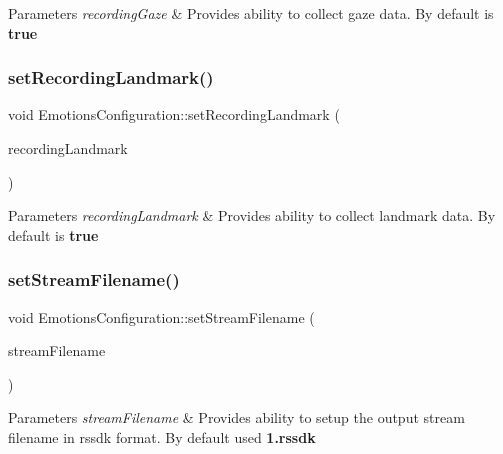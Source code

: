 \begin{DoxyParams}{Parameters}
{\em recording\+Gaze} & Provides ability to collect gaze data. By default is {\bfseries true}\\
\hline
\end{DoxyParams}
\mbox{\label{class_emotions_configuration_a6d50830265d85761f5dd0abfa12d5fcb}} 
\subsubsection{\texorpdfstring{set\+Recording\+Landmark()}{setRecordingLandmark()}}
{\footnotesize\ttfamily void Emotions\+Configuration\+::set\+Recording\+Landmark (\begin{DoxyParamCaption}\item[{pxc\+Bool}]{recording\+Landmark }\end{DoxyParamCaption})}


\begin{DoxyParams}{Parameters}
{\em recording\+Landmark} & Provides ability to collect landmark data. By default is {\bfseries true}\\
\hline
\end{DoxyParams}
\mbox{\label{class_emotions_configuration_a59ff9feb080a20721a2ba714fc9f40dc}} 
\subsubsection{\texorpdfstring{set\+Stream\+Filename()}{setStreamFilename()}}
{\footnotesize\ttfamily void Emotions\+Configuration\+::set\+Stream\+Filename (\begin{DoxyParamCaption}\item[{pxc\+C\+H\+AR $\ast$}]{stream\+Filename }\end{DoxyParamCaption})}


\begin{DoxyParams}{Parameters}
{\em stream\+Filename} & Provides ability to setup the output stream filename in rssdk format. By default used {\bfseries 1.\+rssdk}\\
\hline
\end{DoxyParams}
\mbox{\label{class_emotions_configuration_a1eb27ec836c4151d78a826a50566e3a3}} 
